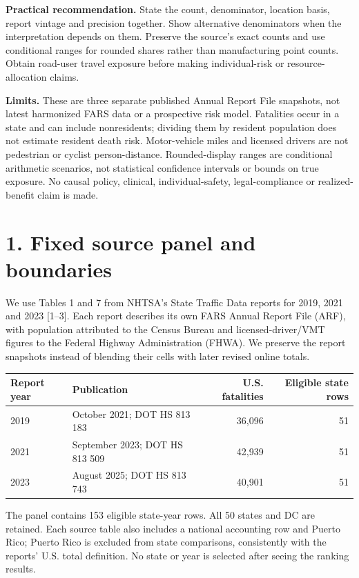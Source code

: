 \documentclass[10pt,letterpaper]{article}
\begin{document}
\textbf{Practical recommendation.} State the count, denominator, location basis, report vintage and precision together. Show alternative denominators when the interpretation depends on them. Preserve the source's exact counts and use conditional ranges for rounded shares rather than manufacturing point counts. Obtain road-user travel exposure before making individual-risk or resource-allocation claims.

\textbf{Limits.} These are three separate published Annual Report File snapshots, not latest harmonized FARS data or a prospective risk model. Fatalities occur in a state and can include nonresidents; dividing them by resident population does not estimate resident death risk. Motor-vehicle miles and licensed drivers are not pedestrian or cyclist person-distance. Rounded-display ranges are conditional arithmetic scenarios, not statistical confidence intervals or bounds on true exposure. No causal policy, clinical, individual-safety, legal-compliance or realized-benefit claim is made.

\clearpage
\section*{1. Fixed source panel and boundaries}
We use Tables 1 and 7 from NHTSA's State Traffic Data reports for 2019, 2021 and 2023 [1--3]. Each report describes its own FARS Annual Report File (ARF), with population attributed to the Census Bureau and licensed-driver/VMT figures to the Federal Highway Administration (FHWA). We preserve the report snapshots instead of blending their cells with later revised online totals.

\begin{center}\begin{tabular}{llrr}\toprule
Report year & Publication & U.S. fatalities & Eligible state rows\\\midrule
2019 & October 2021; DOT HS 813 183 & 36,096 & 51\\
2021 & September 2023; DOT HS 813 509 & 42,939 & 51\\
2023 & August 2025; DOT HS 813 743 & 40,901 & 51\\\bottomrule
\end{tabular}\end{center}

The panel contains 153 eligible state-year rows. All 50 states and DC are retained. Each source table also includes a national accounting row and Puerto Rico; Puerto Rico is excluded from state comparisons, consistently with the reports' U.S. total definition. No state or year is selected after seeing the ranking results.
\end{document}
